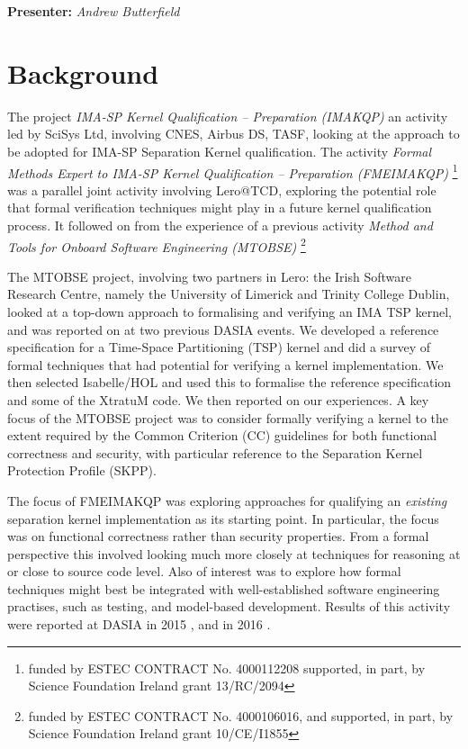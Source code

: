 
\begin{center}
\textbf{Presenter:} \emph{Andrew Butterfield}
\end{center}

\section{Background}

The project
\textit{IMA-SP Kernel Qualification – Preparation (IMAKQP)}
an  activity led by SciSys Ltd,
involving CNES, Airbus DS, TASF,
looking at the approach to be adopted for IMA-SP Separation Kernel qualification.
The activity
\textit{Formal Methods Expert to IMA-SP Kernel Qualification – Preparation
(FMEIMAKQP)}
\footnote{
   funded by ESTEC CONTRACT No. 4000112208
   supported, in part, by Science Foundation Ireland grant 13/RC/2094
}
was a parallel joint activity involving Lero@TCD,
exploring the potential role that formal verification techniques
might play in a future kernel qualification process.
It followed on from the experience of a previous activity
\textit{Method and Tools for Onboard Software Engineering (MTOBSE)}
 \footnote{
   funded by ESTEC CONTRACT No. 4000106016,
   and supported, in part, by Science Foundation Ireland grant 10/CE/I1855
}

The MTOBSE project, involving two partners in Lero: the Irish Software Research Centre,
namely the University of Limerick and Trinity College Dublin,
 looked at a top-down approach to formalising and verifying
an IMA TSP kernel,
and was reported on at two previous DASIA events\cite{MTOBSE-DASIA13,MTOBSE-DASIA13}.
We developed a reference specification for a Time-Space Partitioning (TSP) kernel\cite{MTOBSE-D03} and did a survey of formal techniques that had
potential for verifying a kernel implementation\cite{MTOBSE-D04,MTOBSE-D06}.
We then selected Isabelle/HOL\cite{NPW02} and used this to formalise the
reference specification and some of the XtratuM code\cite{MTOBSE-D07}.
We then reported on our experiences\cite{MTOBSE-D08}.
A key focus of the MTOBSE project was to consider formally verifying a kernel
to the extent required by the Common Criterion (CC) guidelines for both functional correctness and security\cite{RD-07},
with particular reference to the Separation Kernel Protection Profile (SKPP)\cite{RD-08}.

The focus of FMEIMAKQP was exploring approaches for qualifying
an \emph{existing} separation kernel implementation as its starting point.
In particular,
the focus was on functional correctness rather than security properties.
From a formal perspective this involved looking much more closely at techniques
for reasoning at or close to source code level.
Also of interest was to explore how formal techniques might best be integrated
with well-established software engineering practises,
such as testing, and model-based development.
Results of this activity
were reported at DASIA in 2015 \cite{FMEIMAKQP-DASIA15},
and in 2016 \cite{FMEIMAKQP-DASIA16}.

